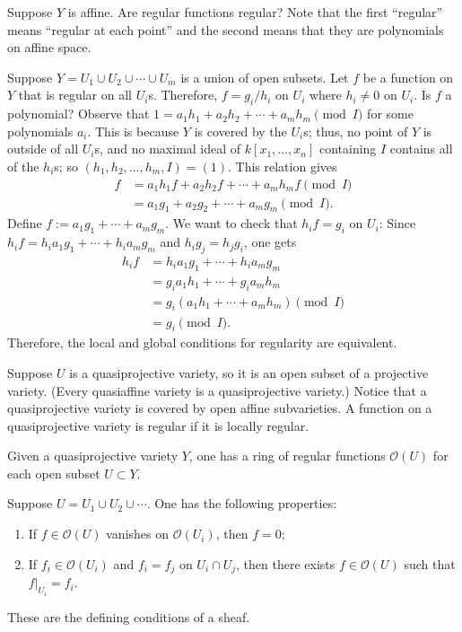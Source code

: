 \documentclass [11 pt, oneside, margin = 1 in] {article}
\begin{document}
\begin{problem}
	Suppose $Y$ is affine. Are regular functions regular? Note that the first ``regular'' means ``regular at each point'' and the second means that they are polynomials on affine space.
\end{problem}

Suppose $Y=U_1\cup U_2\cup \cdots \cup U_m$ is a union of open subsets. Let $f$ be a function on $Y$ that is regular on all $U_i$s. Therefore, $f=g_i/h_i$ on $U_i$ where $h_i\ne 0 $ on $U_i$. Is $f$ a polynomial? Observe that $1= a_1h_1 + a_2h_2 + \cdots +a_mh_m\pmod I$ for some polynomials $a_i$. This is because $Y$ is covered by the $U_i$s; thus, no point of $Y$ is outside of all $U_i$s, and no maximal ideal of $k[x_1,\hdots,x_n]$ containing $I$ contains all of the $h_i$s; so $(h_1,h_2,\hdots, h_m, I)=(1)$. This relation gives
\begin{align*}
	f &= a_1h_1f + a_2h_2f + \cdots + a_mh_mf \pmod I\\
	  &= a_1g_1 + a_2g_2+\cdots + a_mg_m \pmod I.
\end{align*}
Define $f:= a_1g_1+\cdots + a_mg_m$. We want to check that $h_if = g_i$ on $U_i$: Since $h_if = h_ia_1g_1 +\cdots + h_ia_mg_m$ and $h_ig_j = h_jg_i$, one gets
\begin{align*}
	h_if &= h_ia_1g_1 +\cdots + h_ia_mg_m\\
	     &= g_ia_1h_1 + \cdots + g_ia_mh_m\\
	     &= g_i(a_1h_1+\cdots+a_mh_m)\pmod I\\
	     &= g_i \pmod I.
\end{align*}
Therefore, the local and global conditions for regularity are equivalent.

Suppose $U$ is a quasiprojective variety, so it is an open subset of a projective variety. (Every quasiaffine variety is a quasiprojective variety.) Notice that a quasiprojective variety is covered by open affine subvarieties. A function on a quasiprojective variety is  regular if it is locally regular.

Given a quasiprojective variety $Y$, one has a ring of regular functions $\mathscr{O}(U)$ for each open subset $U\subset Y$. 

Suppose $U= U_1\cup U_2\cup \cdots$. One has the following properties:
\begin{enumerate}
	\item If $f\in \mathscr{O}(U) $ vanishes on $\mathscr{O}(U_i) $, then $f = 0$;
	\item If $f_i\in \mathscr{O}(U_i) $ and $f_i = f_j$ on $U_i\cap U_j$, then there exists $f\in \mathscr{O}(U) $ such that $f \big |_{U_i} = f_i$.
\end{enumerate}
These are the defining conditions of a sheaf.
\end{document}

